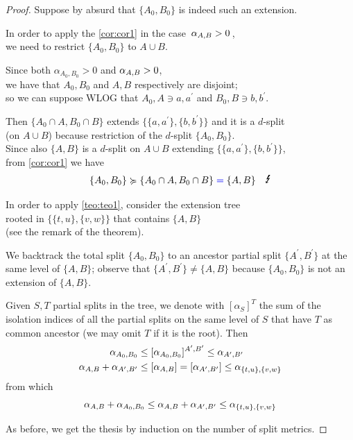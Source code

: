 \documentclass[./main.tex]{subfiles}
\begin{document}
\begin{proof}
    Suppose by absurd that $\{A_0,B_0\}$ is indeed such an extension.
    
    In order to apply the \autoref{cor:cor1} in the case $\, \alpha_{A,B} > 0 \,$, \\[2pt]
    we need to restrict $\{A_0,B_0\}$ to $A \cup B$.
    
    Since both $\alpha_{A_0,B_0} > 0$ and $\alpha_{A,B} > 0$, \\
    \bsp we have that $A_0,B_0$ and $A,B$ respectively are disjoint; \\
    so we can suppose WLOG that $A_0,A \ni a,a^\prime$ and $B_0,B \ni b,b^\prime$.
    
    Then $\{A_0 \cap A, B_0 \cap B\}$ extends $\bigl\{ \{a,a^\prime\},\{b,b^\prime\} \bigr\}$ and it is a $d$-split \\[2pt]
    (on $A \cup B$) because restriction of the $d$-split $\{A_0,B_0\}$. \\[2pt]
    Since also $\{A,B\}$ is a $d$-split on $A \cup B$ extending $\bigl\{ \{a,a^\prime\},\{b,b^\prime\} \bigr\}$, \\
    from \autoref{cor:cor1} we have
    \[ \{A_0,B_0\} \succcurlyeq \{A_0 \cap A, B_0 \cap B\} \mathcolor{blue}{=} \{A,B\} \quad \absurd \nospblw \] \smallskip

    In order to apply \autoref{teo:teo1}, consider the extension tree \\[2pt]
    rooted in $\bigl\{ \{t,u\},\{v,w\} \bigr\}$ that contains $\{A,B\}$ \\(see the remark of the theorem).
    
    We backtrack the total split $\{A_0,B_0\}$ to an ancestor partial split $\{A^\prime,B^\prime\}$ at the same level of $\{A,B\}$; observe that $\{A^\prime,B^\prime\} \neq \{A,B\}$ because $\{A_0,B_0\}$ is not an extension of $\{A,B\}$.
    
    Given $S,T$ partial splits in the tree, we denote with $[\alpha_S]^T$ the sum of the isolation indices of all the partial splits on the same level of $S$ that have $T$ as common ancestor (we may omit $T$ if it is the root). Then
    \begin{align*}
        \alpha_{A_0,B_0} &\leq [\alpha_{A_0,B_0}]^{A^\prime,B^\prime} \leq \alpha_{A^\prime,B^\prime} \\
        \alpha_{A,B} + \alpha_{A^\prime,B^\prime} &\leq [\alpha_{A,B}] = [\alpha_{A^\prime,B^\prime}] \leq \alpha_{\{t,u\},\{v,w\}}
    \end{align*}
    from which
    \[ \alpha_{A,B} + \alpha_{A_0,B_0} \leq \alpha_{A,B} + \alpha_{A^\prime,B^\prime} \leq \alpha_{\{t,u\},\{v,w\}} \] \smallskip

    As before, we get the thesis by induction on the number of split metrics.
\end{proof}
\end{document}
